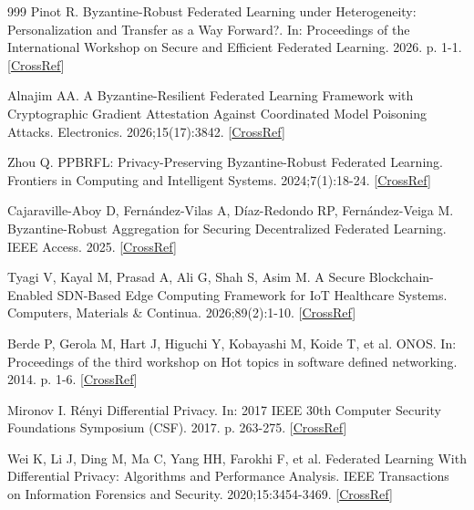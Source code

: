 \documentclass[cmc,article,submit,moreauthors,pdftex]{Definitions/tsp}
\begin{document}
\begin{thebibliography}{999}
Pinot R. Byzantine-Robust Federated Learning under Heterogeneity: Personalization and Transfer as a Way Forward?. In: Proceedings of the International Workshop on Secure and Efficient Federated Learning. 2026. p. 1-1. [\href{https://doi.org/10.1145/3803630.3809173}{CrossRef}]

Alnajim AA. A Byzantine-Resilient Federated Learning Framework with Cryptographic Gradient Attestation Against Coordinated Model Poisoning Attacks. Electronics. 2026;15(17):3842. [\href{https://doi.org/10.3390/electronics15173842}{CrossRef}]

Zhou Q. PPBRFL: Privacy-Preserving Byzantine-Robust Federated Learning. Frontiers in Computing and Intelligent Systems. 2024;7(1):18-24. [\href{https://doi.org/10.54097/6jamgy43}{CrossRef}]

Cajaraville-Aboy D, Fernández-Vilas A, Díaz-Redondo RP, Fernández-Veiga M. Byzantine-Robust Aggregation for Securing Decentralized Federated Learning. IEEE Access. 2025. [\href{https://doi.org/10.1109/access.2025.3629864}{CrossRef}]

Tyagi V, Kayal M, Prasad A, Ali G, Shah S, Asim M. A Secure Blockchain-Enabled SDN-Based Edge Computing Framework for IoT Healthcare Systems. Computers, Materials \& Continua. 2026;89(2):1-10. [\href{https://doi.org/10.32604/cmc.2026.085763}{CrossRef}]

Berde P, Gerola M, Hart J, Higuchi Y, Kobayashi M, Koide T, et al. ONOS. In: Proceedings of the third workshop on Hot topics in software defined networking. 2014. p. 1-6. [\href{https://doi.org/10.1145/2620728.2620744}{CrossRef}]

Mironov I. Rényi Differential Privacy. In: 2017 IEEE 30th Computer Security Foundations Symposium (CSF). 2017. p. 263-275. [\href{https://doi.org/10.1109/csf.2017.11}{CrossRef}]

Wei K, Li J, Ding M, Ma C, Yang HH, Farokhi F, et al. Federated Learning With Differential Privacy: Algorithms and Performance Analysis. IEEE Transactions on Information Forensics and Security. 2020;15:3454-3469. [\href{https://doi.org/10.1109/tifs.2020.2988575}{CrossRef}]

\end{thebibliography}
\end{document}
